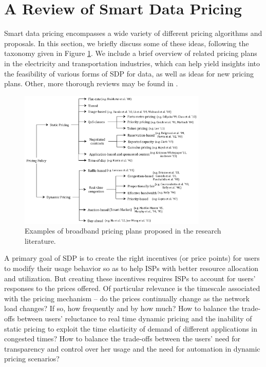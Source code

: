 \section{A Review of Smart Data Pricing}\label{sec:congestion}

Smart data pricing encompasses a wide variety of different pricing algorithms and proposals. In this section, we briefly discuss some of these ideas, following the taxonomy given in Figure \ref{fig:taxonomy}. We include a brief overview of related pricing plans in the electricity and transportation industries, which can help yield insights into the feasibility of various forms of SDP for data, as well as ideas for new pricing plans. Other, more thorough reviews may be found in \cite{CourcoubetisWeber,sen2013survey,Songhurst}.

\begin{figure}
\centering
\includegraphics[width = 0.8\textwidth]{Figures/Taxonomy.pdf}
\caption{Examples of broadband pricing plans proposed in the research literature.}
\label{fig:taxonomy}
\end{figure}

A primary goal of SDP is to create the right incentives (or price points) for users to modify their usage behavior so as to help ISPs with better resource allocation and utilization. But creating these incentives requires ISPs to account for users' responses to the prices offered. Of particular relevance is the timescale associated with the pricing mechanism -- do the prices continually change as the network load changes? If so, how frequently and by how much? How to balance the trade-offs between users' reluctance to real time dynamic pricing and the inability of static pricing to exploit the time elasticity of demand of different applications in congested times? How to balance the trade-offs between the users' need for transparency and control over her usage and the need for automation in dynamic pricing scenarios? 

